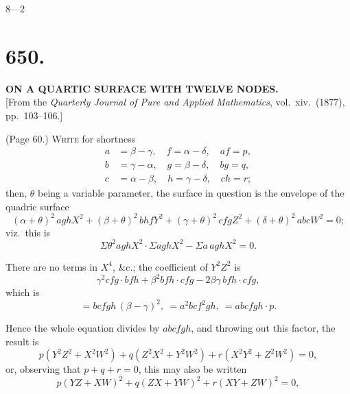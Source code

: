 \documentclass[11pt,a4paper]{article}
\begin{document}
\hfill 8---2

\bigskip


\section*{650.}

\begin{center}
\textbf{ON A QUARTIC SURFACE WITH TWELVE NODES.}\\[1em]
[From the \textit{Quarterly Journal of Pure and Applied Mathematics}, vol.~xiv.\ (1877), pp.~103--106.]
\end{center}

\medskip

\noindent (Page 60.) \textsc{Write} for shortness
\begin{align*}
a &= \beta - \gamma,\quad f = \alpha - \delta,\quad af = p, \\
b &= \gamma - \alpha,\quad g = \beta - \delta,\quad bg = q, \\
c &= \alpha - \beta,\quad h = \gamma - \delta,\quad ch = r;
\end{align*}
then, $\theta$ being a variable parameter, the surface in question is the envelope of the quadric surface
\[
(\alpha + \theta)^2\, aghX^2 + (\beta + \theta)^2\, bhfY^2 + (\gamma + \theta)^2\, cfgZ^2 + (\delta + \theta)^2\, abcW^2 = 0;
\]
viz.\ this is
\[
\Sigma\theta^2 aghX^2 \cdot \Sigma aghX^2 - \Sigma a\, aghX^2 = 0.
\]

There are no terms in $X^4$, \&c.; the coefficient of $Y^2 Z^2$ is
\[
\gamma^2 cfg \cdot bfh + \beta^2 bfh \cdot cfg - 2\beta\gamma\, bfh \cdot cfg,
\]
which is
\[
= bcfgh\, (\beta - \gamma)^2,\ = a^2 bc f^2 gh,\ = abcfgh \cdot p.
\]

Hence the whole equation divides by $abcfgh$, and throwing out this factor, the result is
\[
p(Y^2 Z^2 + X^2 W^2) + q(Z^2 X^2 + Y^2 W^2) + r(X^2 Y^2 + Z^2 W^2) = 0,
\]
or, observing that $p + q + r = 0$, this may also be written
\[
p(YZ + XW)^2 + q(ZX + YW)^2 + r(XY + ZW)^2 = 0,
\]

\bigskip
\end{document}
